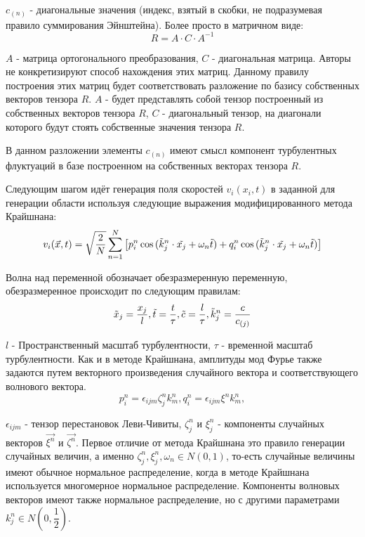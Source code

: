 $c_{\left( n \right)}$ - диагональные значения (индекс, взятый в скобки, не подразумевая правило суммирования Эйнштейна). Более просто в матричном виде:
\begin{equation}
  \label{eq:spectral_equation5}
    R = A \cdot C \cdot A ^ {-1}
\end{equation}

$A$ - матрица ортогонального преобразования, $C$ - диагональная матрица. Авторы не конкретизируют способ нахождения этих матриц. Данному правилу построения этих матриц будет соответствовать разложение по базису собственных векторов тензора $R$. $A$ - будет представлять собой тензор построенный из собственных векторов тензора $R$, $C$ - диагональный тензор, на диагонали которого будут стоять собственные значения тензора $R$. 

В данном разложении элементы $c_{\left( n \right)}$ имеют смысл компонент турбулентных флуктуаций в базе построенном на собственных векторах тензора $R$.

Следующим шагом идёт генерация поля скоростей $v_i(x_i, t)$ в заданной для генерации области используя следующие выражения модифицированного метода Крайшнана:
\begin{equation}
  \label{eq:spectral_equation6}
    v_i(\vec x, t) = \sqrt{\frac{2}{N}} \sum_{n = 1}^{N} \left[ p_i^n \cos{(\Tilde{k}_j^n \cdot \Tilde{x_j} + \omega_n \Tilde{t})} + q_i^n \cos{(\Tilde{k}_j^n \cdot \Tilde{x_j} + \omega_n \Tilde{t})} \right]
\end{equation}

Волна над переменной обозначает обезразмеренную переменную, обезразмеренное происходит по следующим правилам:
\begin{equation}
  \label{eq:spectral_equation7}
    \Tilde{x}_j = \frac{x_j}{l}, \Tilde{t} = \frac{t}{\tau}, \Tilde{c} = \frac{l}{\tau}, \Tilde{k}_j^n = \frac{c}{c_{(j)}}
\end{equation}

$l$ - Пространственный масштаб турбулентности, $\tau$ - временной масштаб турбулентности.
Как и в методе Крайшнана, амплитуды мод Фурье также задаются путем векторного произведения случайного вектора и соответствующего волнового вектора.
\begin{equation}
    \label{eq:spectral_equation8}
    p_i^n = \epsilon_{ijm} \zeta_j^n k_m^n, q_i^n = \epsilon_{ijm} \xi^n k_m^n,
\end{equation}

$\epsilon_{ijm}$ - тензор перестановок Леви-Чивиты, $\zeta_j^n$ и $\xi_j^n$ - компоненты случайных векторов $\vec{\xi^n}$ и $\vec{ \zeta^n}$. Первое отличие от метода Крайшнана это правило генерации случайных величин, а именно $\zeta_j^n, \xi^n_j, \omega_n \in N(0, 1)$, то-есть случайные величины имеют обычное нормальное распределение, когда в методе Крайшнана используется многомерное нормальное распределение. Компоненты волновых векторов имеют также нормальное распределение, но с другими параметрами $k_j^n \in N(0, \dfrac{1}{2})$.

